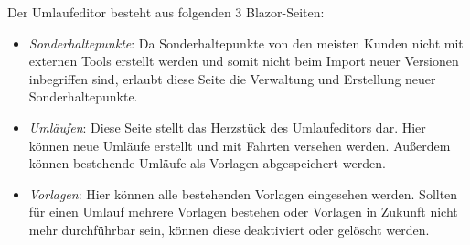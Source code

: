     Der Umlaufeditor besteht aus folgenden 3 Blazor-Seiten: 
    \begin{itemize}
        \item \emph{Sonderhaltepunkte}: Da Sonderhaltepunkte von den meisten Kunden nicht mit externen Tools erstellt werden und somit nicht beim Import neuer Versionen inbegriffen sind, 
                erlaubt diese Seite die Verwaltung und Erstellung neuer Sonderhaltepunkte.
        \item \emph{Umläufen}: Diese Seite stellt das Herzstück des Umlaufeditors dar. Hier können neue Umläufe erstellt und mit Fahrten versehen werden. Außerdem können bestehende Umläufe 
                als Vorlagen abgespeichert werden. 
        \item \emph{Vorlagen}: Hier können alle bestehenden Vorlagen eingesehen werden. Sollten für einen Umlauf mehrere Vorlagen bestehen oder Vorlagen in Zukunft nicht mehr durchführbar sein, können diese
                deaktiviert oder gelöscht werden.
    \end{itemize}



